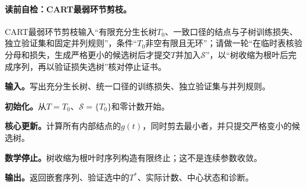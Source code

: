 \paragraph{读前自检：CART最弱环节剪枝。}CART最弱环节剪枝输入“有限充分生长树$T_0$、一致口径的结点与子树训练损失、独立验证集和固定并列规则”，条件“$T_0$非空有限且无环”；请做一轮“在临时表核验分母和损失，生成严格更小的候选树后才提交$T$并加入$\mathcal S$”，以“树收缩为根叶后完成序列，再以验证损失选树”核对停止证书。\par

\begin{keypointbox}[title={CART最弱环节剪枝：五步阅读}]
\textbf{输入。}写出充分生长树、统一口径的训练损失、独立验证集与并列规则。\par
\textbf{初始化。}从$T=T_0$、$\mathcal S=\{T_0\}$和零计数开始。\par
\textbf{核心更新。}计算所有内部结点的$g(t)$，同时剪去最小者，并只提交严格变小的候选树。\par
\textbf{数学停止。}树收缩为根叶时序列构造有限终止；这不是连续参数收敛。\par
\textbf{输出。}返回嵌套序列、验证选中的$T^*$、实际计数、中心状态和诊断。
\end{keypointbox}

